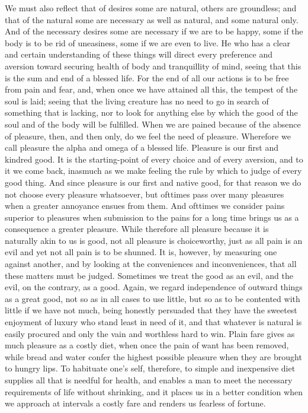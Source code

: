 \documentclass{stex}
\begin{document}
We must also reflect that of desires some are natural, others are groundless; and that of the natural some are necessary as well as natural, and some natural only.
And of the necessary desires some are necessary if we are to be happy, some if the body is to be rid of uneasiness, some if we are even to live.
He who has a clear and certain understanding of these things will direct every preference and aversion toward securing health of body and tranquillity of mind, seeing that this is the sum and end of a blessed life.
For the end of all our actions is to be free from pain and fear, and, when once we have attained all this, the tempest of the soul is laid; seeing that the living creature has no need to go in search of something that is lacking, nor to look for anything else by which the good of the soul and of the body will be fulfilled.
When we are pained because of the absence of pleasure, then, and then only, do we feel the need of pleasure.
Wherefore we call pleasure the alpha and omega of a blessed life.
Pleasure is our first and kindred good.
It is the starting-point of every choice and of every aversion, and to it we come back, inasmuch as we make feeling the rule by which to judge of every good thing.
And since pleasure is our first and native good, for that reason we do not choose every pleasure whatsoever, but ofttimes pass over many pleasures when a greater annoyance ensues from them.
And ofttimes we consider pains superior to pleasures when submission to the pains for a long time brings us as a consequence a greater pleasure.
While therefore all pleasure because it is naturally akin to us is good, not all pleasure is choiceworthy, just as all pain is an evil and yet not all pain is to be shunned.
It is, however, by measuring one against another, and by looking at the conveniences and inconveniences, that all these matters must be judged.
Sometimes we treat the good as an evil, and the evil, on the contrary, as a good.
Again, we regard independence of outward things as a great good, not so as in all cases to use little, but so as to be contented with little if we have not much, being honestly persuaded that they have the sweetest enjoyment of luxury who stand least in need of it, and that whatever is natural is easily procured and only the vain and worthless hard to win.
Plain fare gives as much pleasure as a costly diet, when once the pain of want has been removed,
while bread and water confer the highest possible pleasure when they are brought to hungry lips.
To habituate one's self, therefore, to simple and inexpensive diet supplies all that is needful for health, and enables a man to meet the necessary requirements of life without shrinking, and it places us in a better condition when we approach at intervals a costly fare and renders us fearless of fortune.
\end{document}
